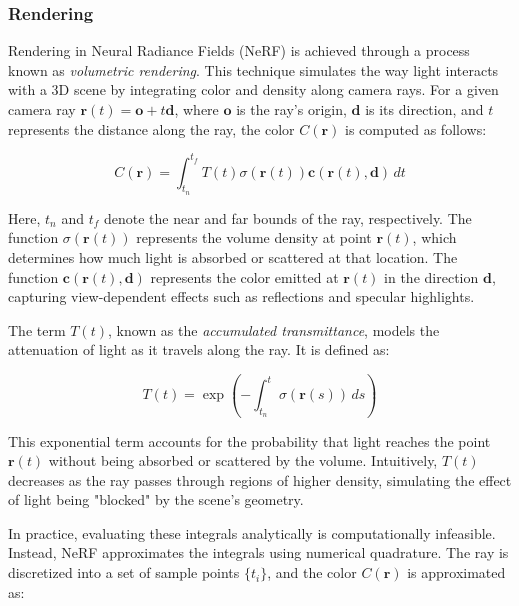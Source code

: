 \subsubsection*{Rendering}

Rendering in Neural Radiance Fields (NeRF) is achieved through a process known as \textit{volumetric rendering}. This technique simulates the way light interacts with a 3D scene by integrating color and density along camera rays. For a given camera ray \( \mathbf{r}(t) = \mathbf{o} + t\mathbf{d} \), where \( \mathbf{o} \) is the ray's origin, \( \mathbf{d} \) is its direction, and \( t \) represents the distance along the ray, the color \( C(\mathbf{r}) \) is computed as follows:

\begin{equation}
C(\mathbf{r}) = \int_{t_n}^{t_f} T(t)\sigma(\mathbf{r}(t))\mathbf{c}(\mathbf{r}(t), \mathbf{d}) \, dt
\label{pre::volumetric-render-equation}
\end{equation}

Here, \( t_n \) and \( t_f \) denote the near and far bounds of the ray, respectively. The function \( \sigma(\mathbf{r}(t)) \) represents the volume density at point \( \mathbf{r}(t) \), which determines how much light is absorbed or scattered at that location. The function \( \mathbf{c}(\mathbf{r}(t), \mathbf{d}) \) represents the color emitted at \( \mathbf{r}(t) \) in the direction \( \mathbf{d} \), capturing view-dependent effects such as reflections and specular highlights.

The term \( T(t) \), known as the \textit{accumulated transmittance}, models the attenuation of light as it travels along the ray. It is defined as:

\begin{equation}
T(t) = \exp\left(-\int_{t_n}^{t} \sigma(\mathbf{r}(s)) \, ds\right)
\end{equation}

This exponential term accounts for the probability that light reaches the point \( \mathbf{r}(t) \) without being absorbed or scattered by the volume. Intuitively, \( T(t) \) decreases as the ray passes through regions of higher density, simulating the effect of light being "blocked" by the scene's geometry.

In practice, evaluating these integrals analytically is computationally infeasible. Instead, NeRF approximates the integrals using numerical quadrature. The ray is discretized into a set of sample points \( \{t_i\} \), and the color \( C(\mathbf{r}) \) is approximated as:

